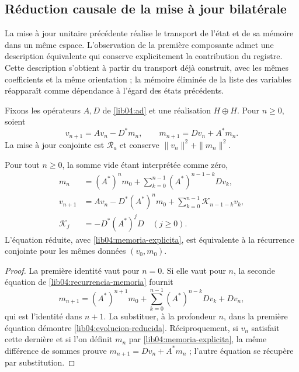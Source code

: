 \subsection{Réduction causale de la mise à jour bilatérale}
\label{lib04:reduccion-causal}

La mise à jour unitaire précédente réalise le transport de l’état et de sa
mémoire dans un même espace. L’observation de la première composante admet
une description équivalente qui conserve explicitement la contribution du
registre. Cette description s’obtient à partir du transport déjà construit, avec les
mêmes coefficients et la même orientation ; la mémoire éliminée de la liste
des variables réapparaît comme dépendance à l’égard des états précédents.

Fixons les opérateurs \(A,D\) de \eqref{lib04:ad} et une réalisation \(H\oplus H\). Pour \(n\geq0\), soient
\begin{equation}
 v_{n+1}=Av_n-D^*m_n,\qquad
 m_{n+1}=Dv_n+A^*m_n.
 \label{lib04:recurrencia-memoria}
\end{equation}
La mise à jour conjointe est \(\mathscr R_a\) et conserve \(\|v_n\|^2+\|m_n\|^2\).

\begin{proposition}
\label{lib04:prop-memoria-reducida}
Pour tout \(n\geq0\), la somme vide étant interprétée comme zéro,
\begin{align}
 m_n&=(A^*)^n m_0+
       \sum_{k=0}^{n-1}(A^*)^{n-1-k}Dv_k,
       \label{lib04:memoria-explicita}\\
 v_{n+1}&=Av_n-D^*(A^*)^n m_0
       +\sum_{k=0}^{n-1}\mathscr K_{n-1-k}v_k,
       \label{lib04:evolucion-reducida}\\
 \mathscr K_j&=-D^*(A^*)^jD\quad(j\geq0).
       \label{lib04:nucleo-retardo}
\end{align}
L’équation réduite, avec \eqref{lib04:memoria-explicita}, est
équivalente à la récurrence conjointe pour les mêmes données \((v_0,m_0)\).
\end{proposition}
\begin{proof}
La première identité vaut pour \(n=0\). Si elle vaut pour \(n\), la seconde équation de \eqref{lib04:recurrencia-memoria} fournit
\[
 m_{n+1}=(A^*)^{n+1}m_0+
 \sum_{k=0}^{n-1}(A^*)^{n-k}Dv_k+Dv_n,
\]
qui est l’identité dans \(n+1\). La substituer, à la profondeur \(n\), dans
la première équation démontre \eqref{lib04:evolucion-reducida}.
Réciproquement, si \(v_n\) satisfait cette dernière et si l’on définit \(m_n\)
par \eqref{lib04:memoria-explicita}, la même différence de sommes prouve
\(m_{n+1}=Dv_n+A^*m_n\) ; l’autre équation se récupère par substitution.
\end{proof}

